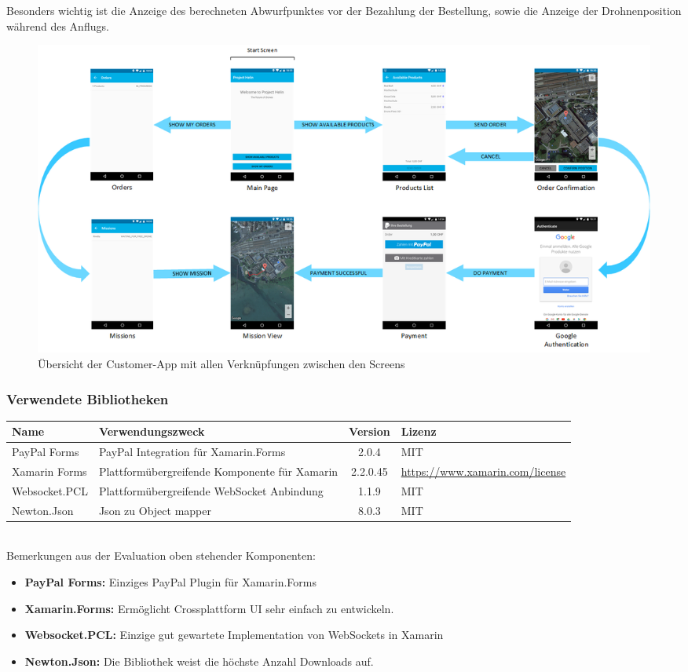 Besonders wichtig ist die Anzeige des berechneten Abwurfpunktes vor der Bezahlung der Bestellung, sowie die Anzeige der Drohnenposition während des Anflugs.  

\begin{landscape}
	\begin{figure}[h]
		\centering
		\includegraphics[width=0.8\paperheight] {images/customer-app-pages.png}
		\caption{Übersicht der Customer-App mit allen Verknüpfungen zwischen den Screens}
		\label{fig:customer-app-flow}
	\end{figure}
\end{landscape}

\subsubsection{Verwendete Bibliotheken}
\begin{tabularx}{\textwidth}{|X|X|c|X|}
	\hline
	\textbf{Name} & \textbf{Verwendungszweck} & \textbf{Version} & \textbf{Lizenz} \\
	\hline \hline
	PayPal Forms & PayPal Integration für Xamarin.Forms & 2.0.4 & MIT \\
	\hline 
	Xamarin Forms & Plattformübergreifende Komponente für Xamarin & 2.2.0.45 & \url{https://www.xamarin.com/license} \\
	\hline 
	Websocket.PCL & Plattformübergreifende WebSocket Anbindung & 1.1.9 & MIT \\
	\hline 
	Newton.Json & Json zu Object mapper & 8.0.3 & MIT \\
	\hline 
\end{tabularx}\\

Bemerkungen aus der Evaluation oben stehender Komponenten:
\begin{itemize}
	\item{\textbf{PayPal Forms:} Einziges PayPal Plugin für Xamarin.Forms}
	\item{\textbf{Xamarin.Forms:} Ermöglicht Crossplattform UI sehr einfach zu entwickeln.}
	\item{\textbf{Websocket.PCL:} Einzige gut gewartete Implementation von WebSockets in Xamarin}
	\item{\textbf{Newton.Json:} Die Bibliothek weist die höchste Anzahl Downloads auf.}
\end{itemize}

